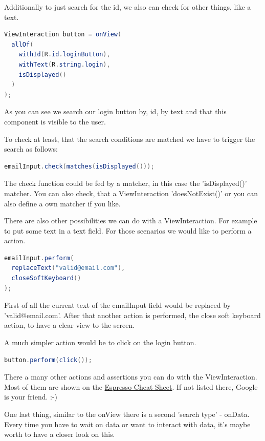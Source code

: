 	Additionally to just search for the id, we also can check for other things, like a text.
	\begin{lstlisting}[language=Java]
ViewInteraction button = onView(
  allOf(
    withId(R.id.loginButton),
    withText(R.string.login),
    isDisplayed()
  )
);
	\end{lstlisting}
	
	As you can see we search our login button by, id, by text and that this component is visible to the user.
	
	To check at least, that the search conditions are matched we have to trigger the search as follows:
	\begin{lstlisting}[language=Java]
emailInput.check(matches(isDisplayed()));
	\end{lstlisting}
	
	The check function could be fed by a matcher, in this case the 'isDisplayed()' matcher. You can also check, that a ViewInteraction 'doesNotExist()' or you can also define a own matcher if you like.
	
	There are also other possibilities we can do with a ViewInteraction. For example to put some text in a text field. For those scenarios we would like to perform a action.
	
	\begin{lstlisting}[language=Java]
emailInput.perform(
  replaceText("valid@email.com"),
  closeSoftKeyboard()
);
	\end{lstlisting}
	
	First of all the current text of the emailInput field would be replaced by 'valid@email.com'. After that another action is performed, the close soft keyboard action, to have a clear view to the screen.
	
	A much simpler action would be to click on the login button.
	
	\begin{lstlisting}[language=Java]
button.perform(click());
	\end{lstlisting}
	
	There a many other actions and assertions you can do with the ViewInteraction. Most of them are shown on the \href{https://developer.android.com/training/testing/espresso/cheat-sheet}{Espresso Cheat Sheet}. If not listed there, Google is your friend. :-)
	
	One last thing, similar to the onView there is a second 'search type' - onData. Every time you have to wait on data or want to interact with data, it's maybe worth to have a closer look on this.
	
